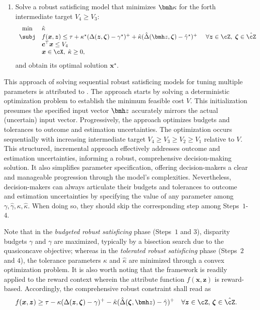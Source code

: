 \documentclass[opre, blindrev]{informs4}
\newcommand{\1}[1]{\mathds{1}{\left(#1\right)}}
\begin{document}
\begin{enumerate}[Step 1.]
\item Solve a robust satisficing model that minimizes $\bmh \kappa$ for the forth intermediate target $V_{4} \geq V_{3}$: 
\[
\begin{array}{cll} 
\min & \hat \kappa \\
{\subj} &  f(\bm x,\bm z) \leq \tau +  \kappa^\star (\Delta(\bm z,\bm \zeta) - \gamma^\star)^+ + \hat \kappa (\hat \Delta(\bmh z,\bm \zeta) - \hat \gamma^\star)^+  &~\forall \bm z \in \cZ, \; \bm \zeta \in \hat \cZ \\
& \bm c^\top \bm x \leq V_{4} \\
& \bm x \in \cX, \; \hat \kappa \geq 0,
\end{array}
\]
and obtain its optimal solution $\bm x^\star$. 
\end{enumerate} 

This approach of solving sequential robust satisficing models for tuning multiple parameters is attributed to \cite{sim2021analytics}. The approach 
starts by solving a deterministic optimization problem to establish the minimum feasible cost $V$. This initialization presumes the specified input vector $\bmh z$ accurately mirrors the actual (uncertain) input vector.
Progressively, the approach optimizes budgets and tolerances to outcome and estimation uncertainties. The optimization occurs sequentially with increasing intermediate target $V_{4} \geq V_{3} \geq V_{2} \geq V_{1}$ relative to $V$. This structured, incremental approach effectively addresses outcome and estimation uncertainties, informing a robust, comprehensive decision-making solution. It also simplifies parameter specification, offering decision-makers a clear and manageable progression through the model's complexities. Nevertheless, decision-makers can always articulate their budgets and tolerances to outcome and estimation uncertainties by specifying the value of any parameter among $\gamma, \hat \gamma, \kappa, \hat \kappa$. When doing so, they should skip the corresponding step among Steps~$1$-$4$.

Note that in the \textit{budgeted robust satisficing} phase (Steps~$1$ and $3$), disparity budgets $\gamma$ and $\hat \gamma$ are maximized, typically by a bisection search due to the quasiconcave objective; whereas in the \textit{tolerated robust satisficing} phase (Steps~$2$ and $4$), the tolerance parameters $\kappa$ and $\hat \kappa$ are minimized through a convex optimization problem. It is also worth noting that the framework is readily applied to the reward context wherein the attribute function $f(\bm x, \bm z)$ is reward-based. Accordingly, the comprehensive robust constraint shall read as
\[
f(\bm x,\bm z) \geq \tau - \kappa (\Delta(\bm z,\bm \zeta) - \gamma)^+ - \hat \kappa (\hat \Delta(\bm \zeta,\bmh z) - \hat \gamma)^+ ~~~\forall \bm z \in \cZ , \, \bm \zeta \in \hat \cZ.
\]
\end{document}

